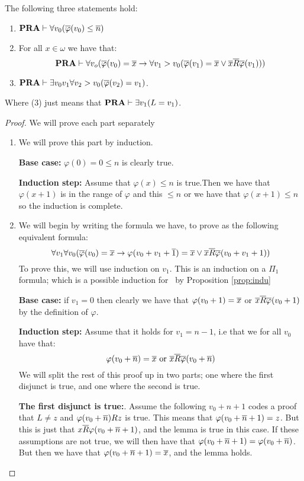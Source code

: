 \documentclass[../main.tex]{subfiles}
\begin{document}
\begin{lem}
	\label{lem:2}
	The following three statements hold:
	\begin{enumerate}
		\item $\text{\textbf{PRA}}\vdash\forall v_0(\overline \varphi (v_0)\leq \overline n)$
		\item For all $x\in\omega$ we have that:\ $$\text{\textbf{PRA}}\vdash\forall
			v_o(\overline
			\varphi (v_0)=\overline x\rightarrow\forall v_1>v_0(\overline
			\varphi (v_1)=\overline x\vee
			\overline x\overline R\overline \varphi (v_1)))$$
		\item $\text{\textbf{PRA}}\vdash\exists v_0v_1\forall v_2>v_0(\overline \varphi (v_2)=v_1)$. 
	\end{enumerate}
	Where (3) just means that $\text{\textbf{PRA}}\vdash\exists v_1(L=v_1)$.
\end{lem}
\begin{proof}

	We will prove each part separately 

	\begin{enumerate}

		\item We will prove this part by induction.

			\textbf{Base case:} $\varphi(0)=0\leq n$ is clearly true.

			\textbf{Induction step:} Assume that $\varphi(x)\leq n$ is
			true.Then we have that $\varphi(x+1)$ is in the range
			of $\varphi$
			and this $\leq n$ or we have that $\varphi(x+1)\leq n$ so the
			induction is complete.
		\item We will begin by writing the formula we have, to prove as
			the following equivalent formula:
			$$\forall v_1\forall v_0(\overline{\varphi}(v_0)=\overline x\rightarrow
			\varphi(v_0 + v_1+\overline 1)=\overline x\vee \overline x\overline R\overline
			\varphi(v_0+v_1+1))$$
			To prove this, we will use induction on $v_1$. This is
			an induction on a $\Pi_1$ formula; which is a possible
			induction for \PRA\ by Proposition \ref{prop:indu}

			\textbf{Base case:} if $v_1=0$ then clearly we have that
			$\varphi(v_0+1)=\overline x$ or $\overline x\overline R\overline
			\varphi(v_0+1)$ by the definition of $\varphi$.

			\textbf{Induction step:} Assume that it holds for
			$v_1=n-1$, i.e that we for all $v_0$ have that:
			\[\varphi(v_0+\ol n)=\ol x\ \text{or}\ \ol x\ol
			R\ol\varphi(v_0+\ol n)\]
			We will split the rest of this proof up in two parts;
			one where the first disjunct is true, and one where the
			second is true.

			\textbf{The first disjunct is true:}. Assume the
			following
			$v_0+n+1$ codes a proof that $L\not =z$ and
			$\varphi(v_0+\overline n) Rz$ is true. This means that
			$\varphi(v_0+\overline n+1)=z$. But this is just that $x\overline
			R\varphi(v_0+\overline n+1)$, and the lemma is true in this case.
			If these assumptions are not true, we will then have
			that $\varphi(v_0+\overline n+1)=\varphi(v_0+\overline n)$. But
			then we have that $\varphi(v_0+\overline n+1)=\overline x$, and the
			lemma holds.
			

\end{enumerate}
\end{proof}
\end{document}

